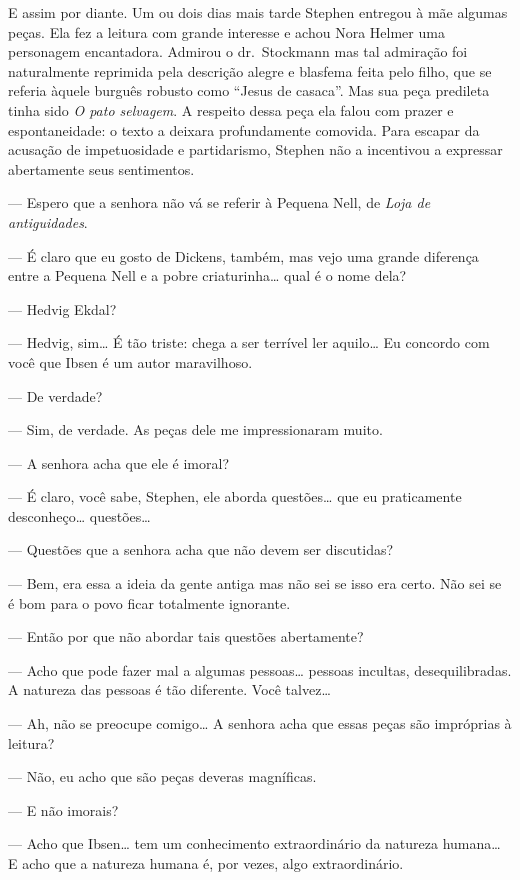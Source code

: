 E assim por diante.  Um ou dois dias mais tarde Stephen entregou à
mãe algumas peças.  Ela fez a leitura com grande interesse e achou Nora
Helmer uma personagem encantadora.  Admirou o dr.~Stockmann mas tal
admiração foi naturalmente reprimida pela descrição alegre e blasfema
feita pelo filho, que se referia àquele burguês robusto como “Jesus de
casaca”.  Mas sua peça predileta tinha sido \textit{O pato selvagem}.
A respeito dessa peça ela falou com prazer e espontaneidade: o texto a
deixara profundamente comovida.  Para escapar da acusação de
impetuosidade e partidarismo, Stephen não a incentivou a expressar
abertamente seus sentimentos.

--- Espero que a senhora não vá se referir à Pequena Nell, de
\textit{Loja de antiguidades}.					

--- É claro que eu gosto de Dickens, também, mas vejo uma grande
diferença entre a Pequena Nell e a pobre criaturinha\ldots{} qual é o nome
dela?

--- Hedvig Ekdal?

--- Hedvig, sim\ldots{}  É tão triste: chega a ser terrível ler
aquilo\ldots{}  Eu concordo com você que Ibsen é um autor maravilhoso.

--- De verdade?

--- Sim, de verdade.  As peças dele me impressionaram muito.

--- A senhora acha que ele é imoral?

--- É claro, você sabe, Stephen, ele aborda questões\ldots{} que eu
praticamente desconheço\ldots{} questões\ldots{}

--- Questões que a senhora acha que não devem ser discutidas?

--- Bem, era essa a ideia da gente antiga mas não sei se isso era
certo.  Não sei se é bom para o povo ficar totalmente ignorante.

--- Então por que não abordar tais questões abertamente?

--- Acho que pode fazer mal a algumas pessoas\ldots{} pessoas
incultas, desequilibradas.  A natureza das pessoas é tão diferente.
Você talvez\ldots{}

--- Ah, não se preocupe comigo\ldots{}  A senhora acha que essas peças
são impróprias à leitura?

--- Não, eu acho que são peças deveras magníficas.		

--- E não imorais?

--- Acho que Ibsen\ldots{} tem um conhecimento extraordinário da
natureza humana\ldots{}  E acho que a natureza humana é, por vezes, algo
extraordinário.

